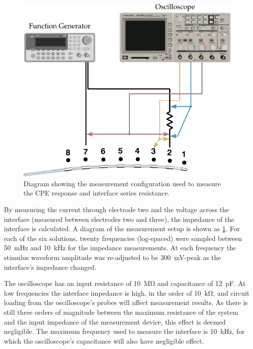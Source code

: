       \begin{figure}
          \centering
          \includegraphics[scale=0.95]{content/pt2/08-InterfaceParameters/graphics/measurement_CPE_setup}
          \caption{\label{fig:pt2-measurement_CPE_setup}Diagram showing the measurement configuration used to measure the CPE response and interface series resistance.}
      \end{figure}
      By measuring the current through electrode two and the voltage across the interface (measured between electrodes two and three), the impedance of the interface is calculated.
      A diagram of the measurement setup is shown as \cref{fig:pt2-measurement_CPE_setup}.
      For each of the six solutions, twenty frequencies (log-spaced) were sampled between \SI{50}{\milli\hertz} and \SI{10}{\kilo\hertz} for the impedance measurements.
      At each frequency the stimulus waveform amplitude was re-adjusted to be \SI{300}{\milli\volt}-peak as the interface's impedance changed.

      The oscilloscope has an input resistance of \SI{10}{\mega\ohm} and capacitance of \SI{12}{\pico\farad}.
      At low frequencies the interface impedance is high, in the order of \SI{10}{\kilo\ohm}, and circuit loading from the oscilloscope's probes will affect measurement results.
      As there is still three orders of magnitude between the maximum resistance of the system and the input impedance of the measurement device, this effect is deemed negligible.
      The maximum frequency used to measure the interface is \SI{10}{\kilo\hertz}, for which the oscilloscope's capacitance will also have negligible effect.

